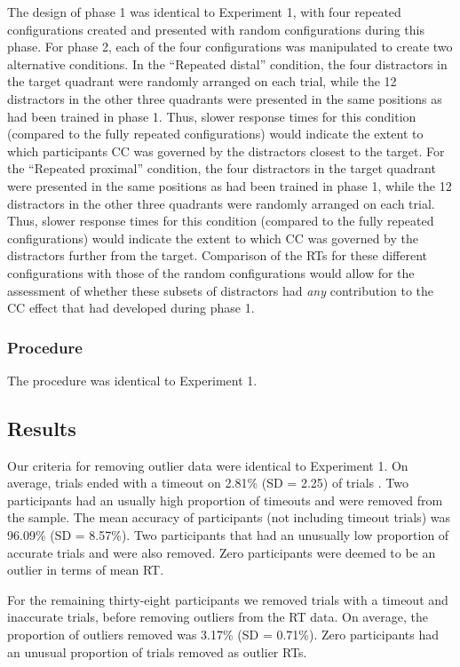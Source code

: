 \documentclass[
  man,
  floatsintext,
  longtable,
  nolmodern,
  notxfonts,
  notimes,
  colorlinks=true,linkcolor=blue,citecolor=blue,urlcolor=blue]{apa7}
\begin{document}
The design of phase 1 was identical to Experiment 1, with four repeated
configurations created and presented with random configurations during
this phase. For phase 2, each of the four configurations was manipulated
to create two alternative conditions. In the ``Repeated distal''
condition, the four distractors in the target quadrant were randomly
arranged on each trial, while the 12 distractors in the other three
quadrants were presented in the same positions as had been trained in
phase 1. Thus, slower response times for this condition (compared to the
fully repeated configurations) would indicate the extent to which
participants CC was governed by the distractors closest to the target.
For the ``Repeated proximal'' condition, the four distractors in the
target quadrant were presented in the same positions as had been trained
in phase 1, while the 12 distractors in the other three quadrants were
randomly arranged on each trial. Thus, slower response times for this
condition (compared to the fully repeated configurations) would indicate
the extent to which CC was governed by the distractors further from the
target. Comparison of the RTs for these different configurations with
those of the random configurations would allow for the assessment of
whether these subsets of distractors had \emph{any} contribution to the
CC effect that had developed during phase 1.

\subsubsection{Procedure}\label{procedure-2}

The procedure was identical to Experiment 1.

\subsection{Results}\label{results-2}

Our criteria for removing outlier data were identical to Experiment 1.
On average, trials ended with a timeout on 2.81\% (SD = 2.25) of trials
. Two participants had an usually high proportion of timeouts and were
removed from the sample. The mean accuracy of participants (not
including timeout trials) was 96.09\% (SD = 8.57\%). Two participants
that had an unusually low proportion of accurate trials and were also
removed. Zero participants were deemed to be an outlier in terms of mean
RT.

For the remaining thirty-eight participants we removed trials with a
timeout and inaccurate trials, before removing outliers from the RT
data. On average, the proportion of outliers removed was 3.17\% (SD =
0.71\%). Zero participants had an unusual proportion of trials removed
as outlier RTs.
\end{document}
